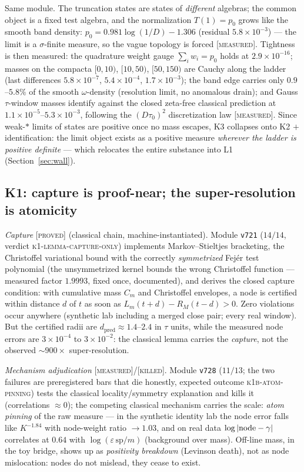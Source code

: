 \documentclass[11pt,a4paper]{article}
\theoremstyle{remark}
\newcommand{\PROVED}{\textnormal{[\textsc{proved}]}}
\newcommand{\MEASURED}{\textnormal{[\textsc{measured}]}}
\newcommand{\KILLED}{\textnormal{[\textsc{killed}]}}
\begin{document}
Same module.  The truncation states are states of \emph{different}
algebras; the common object is a fixed test algebra, and the
normalization $T(1)=p_0$ grows like the smooth band density:
$p_0=0.981\log(1/D)-1.306$ (residual $5.8\times10^{-3}$) --- the
limit is a $\sigma$-finite measure, so the vague topology is forced
\MEASURED.  Tightness is then measured: the quadrature weight gauge
$\sum_i w_i=p_0$ holds at $2.9\times10^{-16}$; masses on the
compacta $[0,10)$, $[10,50)$, $[50,150)$ are Cauchy along the ladder
(last differences $5.8\times10^{-7}$, $5.4\times10^{-4}$,
$1.7\times10^{-3}$); the band edge carries only $0.9$--$5.8\%$ of
the smooth $\omega$-density (resolution limit, no anomalous drain);
and Gauss $\tau$-window masses identify against the closed zeta-free
classical prediction at $1.1\times10^{-5}$--$5.3\times10^{-3}$,
following the $(D\tau_0)^2$ discretization law \MEASURED.  Since
weak-$*$ limits of states are positive once no mass escapes, K3
collapses onto K2 $+$ identification: the limit object exists as a
positive measure \emph{wherever the ladder is positive definite} ---
which relocates the entire substance into L1
(Section~\ref{sec:wall}).

\subsection{K1: capture is proof-near; the super-resolution is
atomicity}\label{sec:k1}

\emph{Capture} \PROVED{} (classical chain, machine-instantiated).
Module \texttt{v721} ($14/14$, verdict
\textsc{k1-lemma-capture-only}) implements Markov--Stieltjes
bracketing, the Christoffel variational bound with the correctly
\emph{symmetrized} Fej\'er test polynomial (the unsymmetrized kernel
bounds the wrong Christoffel function --- measured factor $1.9993$,
fixed once, documented), and derives the closed capture condition:
with cumulative mass $C_m$ and Christoffel envelopes, a node is
certified within distance $d$ of $t$ as soon as
$L_m(t+d)-R_M(t-d)>0$.  Zero violations occur anywhere (synthetic
lab including a merged close pair; every real window).  But the
certified radii are $d_{\mathrm{pred}}\approx1.4$--$2.4$ in $\tau$
units, while the measured node errors are $3\times10^{-4}$ to
$3\times10^{-2}$: the classical lemma carries the \emph{capture},
not the observed $\sim900\times$ super-resolution.

\emph{Mechanism adjudication} \MEASURED/\KILLED.  Module
\texttt{v728} ($11/13$; the two failures are preregistered bars
that die honestly, expected outcome \textsc{k1b-atom-pinning}) tests
the classical locality/symmetry explanation and kills it (correlations
$\approx0$); the competing classical mechanism carries the scale:
\emph{atom pinning} of the raw measure --- in the synthetic identity
lab the node error falls like $K^{-1.84}$ with node-weight ratio
$\to1.03$, and on real data $\log|{\rm node}-\gamma|$ correlates at
$0.64$ with $\log(\varepsilon\,\mathrm{sp}/m)$ (background over
mass).  Off-line mass, in the toy bridge, shows up as
\emph{positivity breakdown} (Levinson death), not as node
mislocation: nodes do not mislead, they cease to exist.
\end{document}
